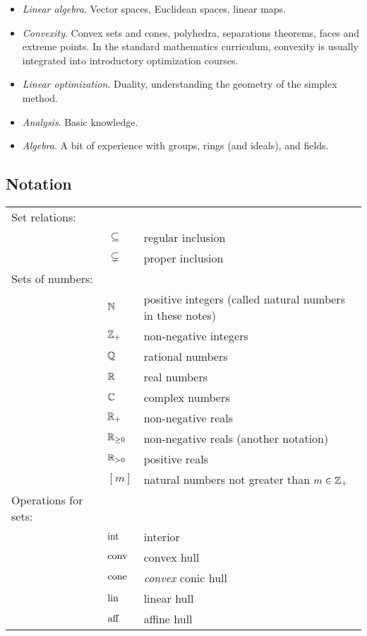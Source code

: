 \begin{itemize}
	\item[] \emph{Linear algebra}. Vector spaces, Euclidean spaces, linear maps. 
	\item[] \emph{Convexity}. Convex sets and cones, polyhedra, separations theorems, faces and extreme points. In the standard mathematics curriculum, convexity is usually integrated into introductory optimization courses.
	\item[] \emph{Linear optimization}. Duality, understanding the geometry of the simplex method. 
	\item[] \emph{Analysis}. Basic knowledge. 
	\item[] \emph{Algebra}. A bit of experience with groups, rings (and ideals), and fields. 
\end{itemize}

\subsection{Notation} 

\begin{tabular}{lll}
Set relations:	& & 
\\		& $\subseteq$ & regular inclusion 
\\ 		& $\varsubsetneq$ & proper inclusion
\\ Sets of numbers: & &
\\ & $\mathbb{N}$  & positive integers (called natural numbers in these notes)
\\ & $\mathbb{Z}_+$ & non-negative integers
\\ & $\mathbb{Q}$ & rational numbers
\\ & $\mathbb{R}$ & real numbers
\\ & $\mathbb{C}$ & complex numbers
\\ & $\mathbb{R}_+$ & non-negative reals 
\\ & $\mathbb{R}_{\ge 0}$ & non-negative reals (another notation)
\\ & $\mathbb{R}_{>0}$ & positive reals
\\ & $[m]$ & natural numbers not greater than $m \in \mathbb{Z}_+$
\\ Operations for sets: & & 
\\ & $\operatorname{int}$ & interior
\\ &  $\operatorname{conv}$ & convex hull
\\ &  $\operatorname{cone}$ & \emph{convex} conic hull
\\ & $\operatorname{lin}$ & linear hull
\\ & $\operatorname{aff}$ & affine hull
\end{tabular} 

